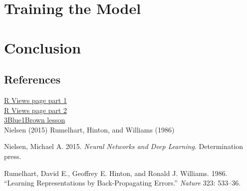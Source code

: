 \documentclass[
]{article}
\newlength{\cslhangindent}
\newlength{\cslentryspacingunit} %
\newenvironment{CSLReferences}[2] %
 {%
  \setlength{\parindent}{0pt}
  \ifodd #1
  \let\oldpar\par
  \def\par{\hangindent=\cslhangindent\oldpar}
  \fi
  \setlength{\parskip}{#2\cslentryspacingunit}
 }%
 {}
\begin{document}
\hypertarget{training-the-model}{%
\section{Training the Model}\label{training-the-model}}

\hypertarget{conclusion}{%
\section{Conclusion}\label{conclusion}}

\hypertarget{references}{%
\subsection{References}\label{references}}

\href{https://rviews.rstudio.com/2020/07/20/shallow-neural-net-from-scratch-using-r-part-1/}{R
Views page part 1}\\
\href{https://rviews.rstudio.com/2020/07/24/building-a-neural-net-from-scratch-using-r-part-2/}{R
Views page part 2}\\
\href{https://www.3blue1brown.com/lessons/backpropagation-calculus}{3Blue1Brown
lesson}\\
Nielsen (2015) Rumelhart, Hinton, and Williams (1986)

\hypertarget{refs}{}
\begin{CSLReferences}{1}{0}
\leavevmode{}%
Nielsen, Michael A. 2015. \emph{Neural Networks and Deep Learning}.
Determination press.

\leavevmode{}%
Rumelhart, David E., Geoffrey E. Hinton, and Ronald J. Williams. 1986.
{``Learning Representations by Back-Propagating Errors.''} \emph{Nature}
323: 533--36.

\end{CSLReferences}
\end{document}
